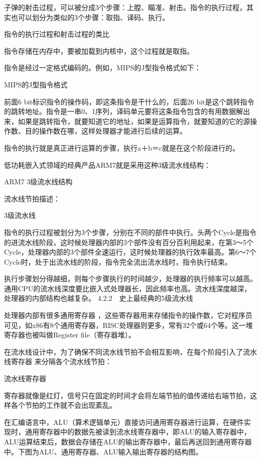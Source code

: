 \documentclass[12pt,UTF8]{ctexbook}
\begin{document}
子弹的射击过程，可以被分成3个步骤：上膛、瞄准、射击。指令的执行过程，其实也可以划分为类似的3个步骤：取指、译码、执行。

指令的执行过程和射击过程的类比

指令存储在内存中，要被加载到内核中，这个过程就是取指。

指令是经过一定格式编码的。例如，MIPS的J型指令格式如下：

MIPS的J型指令格式

前面6 bit标识指令的操作码，即这条指令是干什么的，后面26 bit是这个跳转指令的跳转地址。指令是一串0、1序列，译码单元要将这条指令包含的有用数据解出来，如果是跳转指令，就要知道它的地址，如果是运算指令，就要知道的它的源操作数、目的操作数在哪，这样处理器才能进行后续的运算。

指令的执行就是真正进行运算的步骤，执行a＋b＝c就是在这个阶段进行的。

低功耗嵌入式领域的经典产品ARM7就是采用这种3级流水线结构：

ARM7 3级流水线结构

流水线节拍描述：

3级流水线

指令的执行过程被划分为3个步骤，分别在不同的部件中执行。头两个Cycle是指令的进流水线阶段，这时候处理器内部的3个部件没有百分百利用起来，在第3～5个Cycle，处理器内部的3个部件全速运行，这时候处理器的执行效率最高。第6～7个Cycle时，处于出流水线的阶段，指令完全流出流水线时，指令执行结束。

执行步骤划分得越细，则每个步骤执行的时间越少，处理器的执行频率可以越高。通用CPU的流水线深度要比嵌入式处理器长，因此频率也高。流水线深度越深，处理器的内部结构也越复杂。
4.2.2　史上最经典的5级流水线

处理器内部有很多通用寄存器 ，这些寄存器用来存储指令的操作数，它对程序员可见，如x86有8个通用寄存器，RISC处理器则更多，常有32个或64个等。这一堆寄存器也被叫做Register file（寄存器堆）。

在流水线设计中，为了确保不同流水线节拍不会相互影响，在每个阶段引入了流水线寄存器 来分隔各个流水线节拍：

流水线寄存器

寄存器就像是红灯，信号只在固定的时间才会将左端节拍的值传递给右端节拍，这样各个节拍的工作就不会出现紊乱。

在汇编语言中，ALU（算术逻辑单元）直接访问通用寄存器进行运算，在硬件实现时，通用寄存器中的数据先被读到流水线寄存器中，即ALU的输入寄存器中，ALU运算结束后，数据会存储在ALU的输出寄存器中，最后再送回到通用寄存器中。下图为ALU、通用寄存器、ALU输入输出寄存器的结构图。
\end{document}
